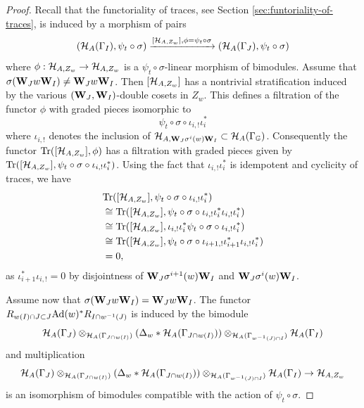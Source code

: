 \documentclass[a4paper, 10pt, oneside, reqno]{amsart}
\theoremstyle{plain}
\theoremstyle{definition}
\theoremstyle{remark}
\newcommand{\Gbb}{\mathbb{G}}
\begin{document}
\begin{proof}
Recall that the functoriality of traces, see Section \ref{sec:funtoriality-of-traces}, is induced by a morphism of pairs 
$$(\mathcal{H}_{A}(\Gamma_I), \psi_t \circ \sigma) \xrightarrow{[\mathcal{H}_{A,Z_w}], \phi = \psi_t \circ \sigma} (\mathcal{H}_{A}(\Gamma_J), \psi_t \circ \sigma)$$
where $\phi : \mathcal{H}_{A,Z_w} \to \mathcal{H}_{A,Z_w}$ is a $\psi_t \circ \sigma$-linear morphism of bimodules. Assume that $\sigma(\mathbf{W}_J w \mathbf{W}_I) \neq \mathbf{W}_J w \mathbf{W}_I$. Then $[\mathcal{H}_{A,Z_w}]$ has a nontrivial stratification induced by the various $(\mathbf{W}_J, \mathbf{W}_I)$-double cosets in $Z_w$. This defines a filtration of the functor $\phi$ with graded pieces isomorphic to 
$$\psi_t \circ \sigma \circ \iota_{i,!}\iota_{i}^*$$
where $\iota_{i,!}$ denotes the inclusion of $\Hcal_{A, \Wbf_J \sigma^i(w) \Wbf_I} \subset \Hcal_A(\Gamma_{\Gbb})$.
Consequently the functor $\mathrm{Tr}([\mathcal{H}_{A,Z_w}], \phi)$ has a filtration with graded pieces given by $\mathrm{Tr}([\mathcal{H}_{A,Z_w}], \psi_t \circ \sigma \circ  \iota_{i,!}\iota_{i}^*)$. Using the fact that $ \iota_{i,!}\iota_{i}^*$ is idempotent and cyclicity of traces, we have 
\begin{align*}
&\mathrm{Tr}([\mathcal{H}_{A,Z_w}], \psi_t \circ \sigma \circ \iota_{i,!}\iota_{i}^*)\\
 &\cong \mathrm{Tr}([\mathcal{H}_{A,Z_w}], \psi_t \circ \sigma \circ  \iota_{i,!}\iota_{i}^* \iota_{i,!}\iota_{i}^*) \\
&\cong \mathrm{Tr}([\mathcal{H}_{A,Z_w}],  \iota_{i,!}\iota_{i}^* \psi_t \circ \sigma \circ  \iota_{i,!}\iota_{i}^*) \\
&\cong \mathrm{Tr}([\mathcal{H}_{A,Z_w}], \psi_t \circ \sigma \circ  \iota_{i+1,!}\iota_{i+1}^* \iota_{i,!}\iota_{i}^*) \\
&= 0,
\end{align*}
as $\iota_{i+1}^* \iota_{i,!} = 0$ by disjointness of $\mathbf{W}_J \sigma^{i+1}(w) \mathbf{W}_I$ and $\mathbf{W}_J \sigma^i(w) \mathbf{W}_I$.

Assume now that $\sigma(\mathbf{W}_J w \mathbf{W}_I) = \mathbf{W}_J w \mathbf{W}_I$. The functor $R_{w(I)\cap J \subset J}\mathrm{Ad}(w)\allowbreak{^*}R_{I \cap {w^{-1}(J)}}$ is induced by the bimodule 
$$\mathcal{H}_A(\Gamma_J) \otimes_{\mathcal{H}_A(\Gamma_{J \cap w(I)})} (\Delta_w * \mathcal{H}_A(\Gamma_{J \cap w(I)})) \otimes_{\mathcal{H}_A(\Gamma_{w^{-1}(J) \cap I})} \mathcal{H}_A(\Gamma_I)$$ 
and multiplication 
$$\mathcal{H}_A(\Gamma_J) \otimes_{\mathcal{H}_A(\Gamma_{J \cap w(I)})} (\Delta_w * \mathcal{H}_A(\Gamma_{J \cap w(I)})) \otimes_{\mathcal{H}_A(\Gamma_{w^{-1}(J) \cap I})} \mathcal{H}_A(\Gamma_I) \to \mathcal{H}_{A,Z_w}$$
is an isomorphism of bimodules compatible with the action of $\psi_t \circ \sigma$.
\end{proof}
\end{document}
